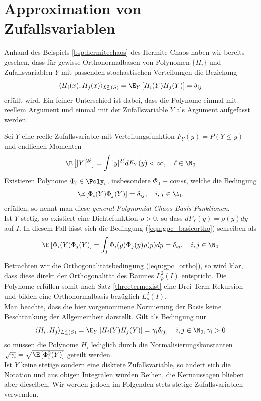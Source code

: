 \section{Approximation von Zufallsvariablen}
Anhand des Beispiels \ref{bsp:hermitechaos} des Hermite-Chaos haben wir bereits gesehen, dass für gewisse Orthonormalbasen von Polynomen $\lbrace H_i\rbrace$ und Zufallsvariablen $Y$ mit passenden stochastischen Verteilungen die Beziehung
\[\langle H_i(x),H_j(x)\rangle_{L_w^2(S)} =\E_Y \left[H_i(Y)H_j(Y)\right]=\delta_{ij}\]
erfüllt wird. Ein feiner Unterschied ist dabei, dass die Polynome einmal mit reellem Argument und einmal mit der Zufallsvariable $Y$ als Argument aufgefasst werden.
\begin{mathdef}
\label{def:gpc}
Sei $Y$ eine reelle Zufallsvariable mit Verteilungsfunktion $F_Y(y)=P(Y\le y)$ und endlichen Momenten
\[\E\left[|Y|^{2\ell}\right]=\int |y|^{2\ell}dF_Y(y)<\infty,\quad \ell\in \N_0\]
Existieren Polynome $\Phi_i\in\Poly_i$, insbesondere $\Phi_0\equiv const$, welche die Bedingung
\begin{equation}
\label{eqn:gpc_basicortho}
\E\left[\Phi_i(Y)\Phi_j(Y)\right]=\delta_{ij},\quad i,j\in\N_0
\end{equation}
erfüllen, so nennt man diese \emph{general Polynomial-Chaos Basis-Funktionen}.\\
Ist $Y$ stetig, so existiert eine Dichtefunktion $\rho>0$, so dass $dF_Y(y)=\rho(y)dy$ auf $I$. In diesem Fall lässt sich die Bedingung (\ref{eqn:gpc_basicortho}) schreiben als
\begin{equation}
\label{eqn:gpc_ortho}
\E\left[\Phi_i(Y)\Phi_j(Y)\right]=\int_I \Phi_i(y)\Phi_j(y)\rho(y)dy=\delta_{ij},\quad i,j\in\N_0
\end{equation}
\end{mathdef}
\begin{mathbem}
Betrachten wir die Orthogonalitätsbedingung (\ref{eqn:gpc_ortho}), so wird klar, dass diese direkt der Orthogonalität des Raumes $L_\rho^2(I)$ entspricht. Die Polynome erfüllen somit nach Satz \ref{threetermexist} eine Drei-Term-Rekursion und bilden eine Orthonormalbasis bezüglich $L_\rho^2(I)$.\\
Man beachte, dass die hier vorgenommene Normierung der Basis keine Beschränkung der Allgemeinheit darstellt. Gilt als Bedingung nur
\[\langle H_i,H_j\rangle_{L_w^2(S)} =\E_Y \left[H_i(Y)H_j(Y)\right]=\gamma_i\delta_{ij},\quad i,j\in\N_0,\gamma_i>0\]
so müssen die Polynome $H_i$ lediglich durch die Normalisierungskonstanten $\sqrt{\gamma_i}=\sqrt{\E\left[\Phi_i^2(Y)\right]}$ geteilt werden.\\
Ist $Y$ keine stetige sondern eine diskrete Zufallsvariable, so ändert sich die Notation und aus obigen Integralen würden Reihen, die Kernaussagen blieben aber dieselben. Wir werden jedoch im Folgenden stets stetige Zufallsvariablen verwenden.
\end{mathbem}
